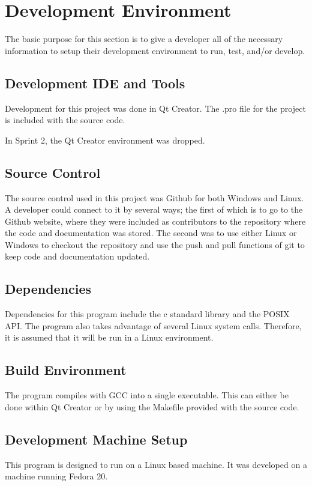 \chapter{Development Environment}
The basic purpose for this section is to give a developer all of the necessary 
information to setup their development environment to run, test, and/or develop.

\section{Development IDE and Tools}
Development for this project was done in Qt Creator. The .pro file for the project is included with 
the source code.

In Sprint 2, the Qt Creator environment was dropped.

\section{Source  Control}
The source control used in this project was Github for both Windows and Linux. A developer could connect 
to it by several ways; the first of which is to go to the Github website, where they were included as 
contributors to the repository where the code and documentation was stored. The second was to use either 
Linux or Windows to checkout the repository and use the push and pull functions of git to keep code and 
documentation updated.

\section{Dependencies}
Dependencies for this program include the c standard library and the POSIX API. The program also takes 
advantage of several Linux system calls. Therefore, it is assumed that it will be run in a Linux environment.

\section{Build  Environment}
The program compiles with GCC into a single executable. This can either be done within Qt Creator or by using 
the Makefile provided with the source code. 

\section{Development Machine Setup}
This program is designed to run on a Linux based machine.
It was developed on a machine running Fedora 20.

